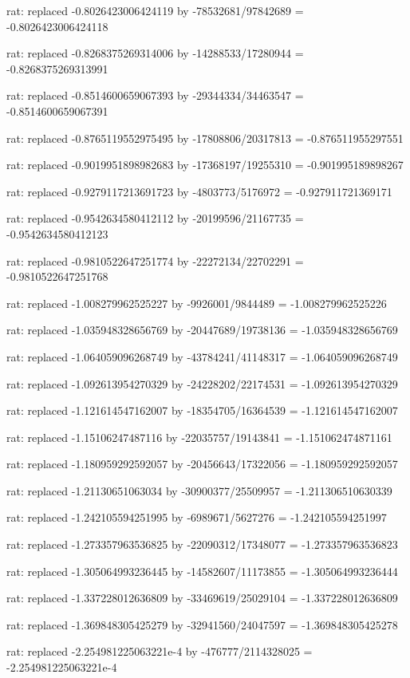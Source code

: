 \documentclass[a4paper,10pt]{article}
\begin{document}
\begin{eulernotebook}
\begin{eulercomment}
\begin{eulercomment}
\begin{eulercomment}
\begin{eulercomment}
\begin{eulercomment}
\begin{eulercomment}
\begin{eulercomment}
\begin{eulercomment}
\begin{eulercomment}
\begin{eulercomment}
\begin{eulercomment}
\begin{eulercomment}
\begin{eulercomment}
\begin{eulercomment}
\begin{eulercomment}
\begin{eulercomment}
\begin{euleroutput}
  rat: replaced -0.8026423006424119 by -78532681/97842689 = -0.8026423006424118
  
  rat: replaced -0.8268375269314006 by -14288533/17280944 = -0.8268375269313991
  
  rat: replaced -0.8514600659067393 by -29344334/34463547 = -0.8514600659067391
  
  rat: replaced -0.8765119552975495 by -17808806/20317813 = -0.876511955297551
  
  rat: replaced -0.9019951898982683 by -17368197/19255310 = -0.901995189898267
  
  rat: replaced -0.9279117213691723 by -4803773/5176972 = -0.927911721369171
  
  rat: replaced -0.9542634580412112 by -20199596/21167735 = -0.9542634580412123
  
  rat: replaced -0.9810522647251774 by -22272134/22702291 = -0.9810522647251768
  
  rat: replaced -1.008279962525227 by -9926001/9844489 = -1.008279962525226
  
  rat: replaced -1.035948328656769 by -20447689/19738136 = -1.035948328656769
  
  rat: replaced -1.064059096268749 by -43784241/41148317 = -1.064059096268749
  
  rat: replaced -1.092613954270329 by -24228202/22174531 = -1.092613954270329
  
  rat: replaced -1.121614547162007 by -18354705/16364539 = -1.121614547162007
  
  rat: replaced -1.15106247487116 by -22035757/19143841 = -1.151062474871161
  
  rat: replaced -1.180959292592057 by -20456643/17322056 = -1.180959292592057
  
  rat: replaced -1.21130651063034 by -30900377/25509957 = -1.211306510630339
  
  rat: replaced -1.242105594251995 by -6989671/5627276 = -1.242105594251997
  
  rat: replaced -1.273357963536825 by -22090312/17348077 = -1.273357963536823
  
  rat: replaced -1.305064993236445 by -14582607/11173855 = -1.305064993236444
  
  rat: replaced -1.337228012636809 by -33469619/25029104 = -1.337228012636809
  
  rat: replaced -1.369848305425279 by -32941560/24047597 = -1.369848305425278
  
  rat: replaced -2.254981225063221e-4 by -476777/2114328025 = -2.254981225063221e-4
  

\end{euleroutput}
\end{eulercomment}
\end{eulercomment}
\end{eulercomment}
\end{eulercomment}
\end{eulercomment}
\end{eulercomment}
\end{eulercomment}
\end{eulercomment}
\end{eulercomment}
\end{eulercomment}
\end{eulercomment}
\end{eulercomment}
\end{eulercomment}
\end{eulercomment}
\end{eulercomment}
\end{eulercomment}
\end{eulernotebook}
\end{document}
